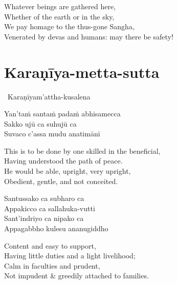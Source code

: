 \begin{english-verses}
  Whatever beings are gathered here,\\
  Whether of the earth or in the sky,\\
  We pay homage to the thus-gone Sangha,\\
  Venerated by devas and humans: may there be safety!
\end{english-verses}

\suttaRef{[Snp 2.1]}

\section{Karaṇīya-metta-sutta}
\label{karaniya-metta-sutta}

\begin{pali-leader}
  \anglebracketleft\ \hspace{-0.5mm}Karaṇīyam'attha-kusalena \hspace{-0.5mm}\anglebracketright\
\end{pali-leader}
\begin{pali-hangtogether}
  Yan'taṁ santaṁ padaṁ abhisamecca\\
  Sakko ujū ca suhujū ca\\
  Suvaco c'assa mudu anatimānī
\end{pali-hangtogether}

\begin{english-verses}
  This is to be done by one skilled in the beneficial,\\
  Having understood the path of peace.\\
  He would be able, upright, very upright,\\
  Obedient, gentle, and not conceited.
\end{english-verses}

\begin{pali-hang-continued}
  Santussako ca subharo ca\\
  Appakicco ca sallahuka-vutti\\
  Sant'indriyo ca nipako ca\\
  Appagabbho kulesu ananugiddho
\end{pali-hang-continued}

\begin{english-verses}
  Content and easy to support,\\
  Having little duties and a light livelihood;\\
  Calm in faculties and prudent,\\
  Not impudent \& greedily attached to families.
\end{english-verses}

